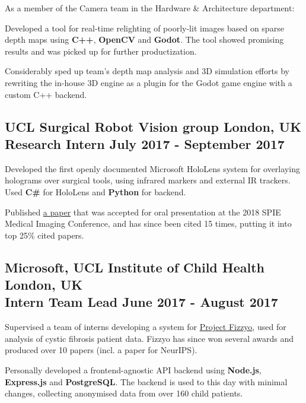 \documentclass{article}
\begin{document}
\begin{specialitemize}
	\item As a member of the Camera team in the Hardware \& Architecture department:
    \begin{specialitemize}
	    \item Developed a tool for real-time relighting of poorly-lit images based on sparse depth maps using \textbf{C++}, \textbf{OpenCV} and \textbf{Godot}. The tool showed promising results and was picked up for further productization.
        \item Considerably sped up team's depth map analysis and 3D simulation efforts by rewriting the in-house 3D engine as a plugin for the Godot game engine with a custom C++ backend.
    \end{specialitemize}
\end{specialitemize}

\subsection*{UCL Surgical Robot Vision group \hfill \textcolor{CompanyLocationText}{London, UK} \\ \colorbox{RoleBackground}{Research Intern} \hfill July 2017 - September 2017}

\begin{specialitemize}
	\item Developed the first openly documented Microsoft HoloLens system for overlaying holograms over surgical tools, using infrared markers and external IR trackers. Used \textbf{C\#} for HoloLens and \textbf{Python} for backend.
	\item Published \href{https://arxiv.org/abs/1802.03274}{a paper} that was accepted for oral presentation at the 2018 SPIE Medical Imaging Conference, and has since been cited 15 times, putting it into top 25\% cited papers.
\end{specialitemize}

\subsection*{Microsoft, UCL Institute of Child Health \hfill \textcolor{CompanyLocationText}{London, UK} \\ \colorbox{RoleBackground}{Intern Team Lead} \hfill June 2017 - August 2017}

\begin{specialitemize}
	\item Supervised a team of interns developing a system for \href{https://fizzyo.github.io/}{Project Fizzyo}, used for analysis of cystic fibrosis patient data. Fizzyo has since won several awards and produced over 10 papers (incl. a paper for NeurIPS).
	\item Personally developed a frontend-agnostic API backend using \textbf{Node.js}, \textbf{Express.js} and \textbf{PostgreSQL}. The backend is used to this day with minimal changes, collecting anonymised data from over 160 child patients.
\end{specialitemize}
\end{document}
